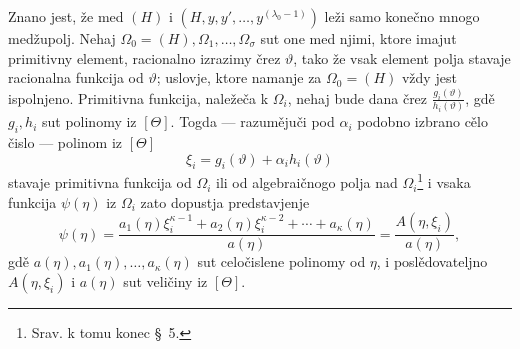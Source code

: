 \documentclass[11pt]{article}
\begin{document}
Znano jest, že med $(H)$ i $(H,y,y',\ldots,y^{(\lambda_0-1)})$ leži samo
konečno mnogo medžupolj. Nehaj $\Omega_0=(H),\Omega_1,\ldots,\Omega_\sigma$
sut one med njimi, ktore imajut
primitivny element, racionalno izrazimy črez $\vartheta$, tako že vsak element
polja stavaje racionalna funkcija od $\vartheta$; uslovje, ktore namanje za
$\Omega_0=(H)$ vždy jest ispolnjeno. Primitivna funkcija, naležeča k
$\Omega_i$, nehaj bude dana črez $\frac{g_i(\vartheta)}{h_i(\vartheta)}$, gdě
$g_i,h_i$ sut polinomy iz $[\Theta]$. Togda --- razumějuči pod $\alpha_i$
podobno izbrano cělo čislo --- polinom iz $[\Theta]$
\[
 \xi_i=g_i(\vartheta)+\alpha_i h_i(\vartheta)
\]
stavaje primitivna funkcija od $\Omega_i$ ili od algebraičnogo polja nad
$\Omega_i$\footnote{Srav. k tomu konec \S\ 5.} i vsaka funkcija $\psi(\eta)$
iz $\Omega_i$ zato dopustja predstavjenje
\begin{equation}
\psi(\eta)=
\frac{a_1(\eta)\xi_i^{\kappa-1}+a_2(\eta)\xi_i^{\kappa-2}+\cdots+a_\kappa(\eta)}
     {a(\eta)}
=\frac{A(\eta,\xi_i)}{a(\eta)},
\tag{2}
\end{equation}
gdě $a(\eta),a_1(\eta),\ldots,a_\kappa(\eta)$ sut celočislene polinomy od
$\eta$, i poslědovateljno $A(\eta,\xi_i)$ i $a(\eta)$ sut veličiny iz
$[\Theta]$.
\end{document}
